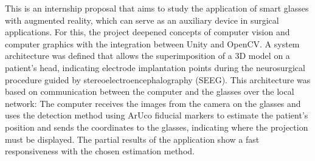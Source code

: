 \documentclass[Portugues]{projetoFAPESP}
\begin{document}

\geraTitulo

\folhaDeRosto

\begin{resumo}
  This is an internship proposal that aims to study the application of smart glasses with augmented reality, which can serve as an auxiliary device in surgical applications. For this, the project deepened concepts of computer vision and computer graphics with the integration between Unity and OpenCV. A system architecture was defined that allows the superimposition of a 3D model on a patient's head, indicating electrode implantation points during the neurosurgical procedure guided by stereoelectroencephalography (SEEG). This architecture was based on communication between the computer and the glasses over the local network: The computer receives the images from the camera on the glasses and uses the detection method using ArUco fiducial markers to estimate the patient's position and sends the coordinates to the glasses, indicating where the projection must be displayed. The partial results of the application show a fast responsiveness with the chosen estimation method.

\end{resumo}

\clearpage
\tableofcontents
\thispagestyle{empty}
\clearpage










\printbibliography[heading=bibintoc, title={References} ]
\end{document}
